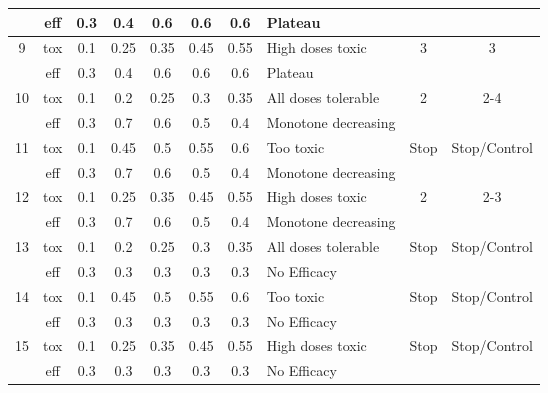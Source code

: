 \begin{table}[h!]
{\begin{tabular}{cc|ccccc|l|cc}
		& eff & 0.3 & 0.4 & 0.6 & 0.6 & 0.6 & Plateau &  &  \\ \hline
		\multirow{2}{*}{9} & tox & 0.1 & 0.25 & 0.35 & 0.45 & 0.55 & High doses toxic & \multirow{2}{*}{3} & \multirow{2}{*}{3} \\
		& eff & 0.3 & 0.4 & 0.6 & 0.6 & 0.6 & Plateau &  &  \\ \hline
		\multirow{2}{*}{10} & tox & 0.1 & 0.2 & 0.25 & 0.3 & 0.35 & All doses tolerable & \multirow{2}{*}{2} & \multirow{2}{*}{2-4} \\
		& eff & 0.3 & 0.7 & 0.6 & 0.5 & 0.4 & Monotone decreasing &  &  \\ \hline
		\multirow{2}{*}{11} & tox & 0.1 & 0.45 & 0.5 & 0.55 & 0.6 & Too toxic & \multirow{2}{*}{Stop} & \multirow{2}{*}{Stop/Control} \\
		& eff & 0.3 & 0.7 & 0.6 & 0.5 & 0.4 & Monotone decreasing &  &  \\ \hline
		\multirow{2}{*}{12} & tox & 0.1 & 0.25 & 0.35 & 0.45 & 0.55 & High doses toxic & \multirow{2}{*}{2} & \multirow{2}{*}{2-3} \\
		& eff & 0.3 & 0.7 & 0.6 & 0.5 & 0.4 & Monotone decreasing &  &  \\ \hline
		\multirow{2}{*}{13} & tox & 0.1 & 0.2 & 0.25 & 0.3 & 0.35 & All doses tolerable & \multirow{2}{*}{Stop} & \multirow{2}{*}{Stop/Control} \\
		& eff & 0.3 & 0.3 & 0.3 & 0.3 & 0.3 & No Efficacy &  &  \\ \hline
		\multirow{2}{*}{14} & tox & 0.1 & 0.45 & 0.5 & 0.55 & 0.6 & Too toxic & \multirow{2}{*}{Stop} & \multirow{2}{*}{Stop/Control} \\
		& eff & 0.3 & 0.3 & 0.3 & 0.3 & 0.3 & No Efficacy &  &  \\ \hline
		\multirow{2}{*}{15} & tox & 0.1 & 0.25 & 0.35 & 0.45 & 0.55 & High doses toxic & \multirow{2}{*}{Stop} & \multirow{2}{*}{Stop/Control} \\
		& eff & 0.3 & 0.3 & 0.3 & 0.3 & 0.3 & No Efficacy &  &  \\ \hline
	\end{tabular}%
}
\end{table}

\newpage

\setlength\LTcapwidth{\textwidth}
\begingroup\fontsize{9}{11}\selectfont

